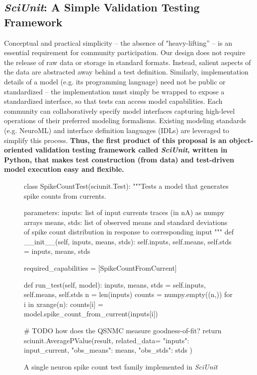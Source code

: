 \documentclass[11pt,letterpaper]{article}
\begin{document}
\subsection{\textit{SciUnit}: A Simple Validation Testing Framework}
Conceptual and practical simplicity -- the absence of "heavy-lifting'' -- is an essential requirement for community participation. Our design does not require the release of raw data or storage in standard formats. Instead, salient aspects of the data are abstracted away behind a test definition. Similarly, implementation details of a model (e.g. its programming language) need not be public or standardized -- the implementation must simply be wrapped to expose a standardized interface, so that tests can access model capabilities. Each community can collaboratively specify model interfaces capturing high-level operations of their preferred modeling formalisms. Existing modeling standards (e.g. NeuroML\cite{neuroml_url,gleeson_neuroml:_2010}) and interface definition languages (IDLs)\cite{bachmann2008} are leveraged to simplify this process. \textbf{Thus, the first product of this proposal is an object-oriented validation testing framework called \textit{SciUnit}, written in Python, that makes test construction (from data) and test-driven model execution easy and flexible.} 

\begin{figure}

\begin{python}
class SpikeCountTest(sciunit.Test):
  """Tests a model that generates spike counts from currents.

  parameters:
    inputs: list of input currents traces (in nA) as numpy arrays
    means, stds: list of observed means and standard deviations of 
      spike count distribution in response to corresponding input
  """
  def __init__(self, inputs, means, stds):
    self.inputs, self.means, self.stds = inputs, means, stds
	
  required_capabilities = [SpikeCountFromCurrent]
	
  def run_test(self, model):
    inputs, means, stds = self.inputs, self.means, self.stds
    n = len(inputs)
    counts = numpy.empty((n,))
    for i in xrange(n):
      counts[i] = model.spike_count_from_current(inputs[i])
      
    # TODO how does the QSNMC measure goodness-of-fit?
    return sciunit.AveragePValue(result, related_data={
      "inputs": input_current,
      "obs_means": means,
      "obs_stds": stds
    })
\end{python}
\vspace{-5px}
\caption{A single neuron spike count test family implemented in \textit{SciUnit}}
\label{fig:rate_test}
\vspace{-10px}
\end{figure}
\end{document}
